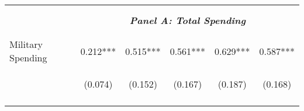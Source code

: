 \begin{tabular}{lccccc}
    \vspace{-2pt} & \vspace{-2pt} & \vspace{-2pt} & \vspace{-2pt} & \vspace{-2pt} \\\hline
    \vspace{-1.5pt} & \vspace{-1.5pt} & \vspace{-1.5pt} & \vspace{-1.5pt} & \vspace{-1.5pt} \\
    \cmidrule{2-6}
    \vspace{-1.5pt} & \vspace{-1.5pt} & \vspace{-1.5pt} & \vspace{-1.5pt} & \vspace{-1.5pt} \\
    & \multicolumn{5}{c}{\textit{\textbf{Panel A: Total Spending}}} \\ 
    \vspace{-1.5pt} & \vspace{-1.5pt} & \vspace{-1.5pt} & \vspace{-1.5pt} & \vspace{-1.5pt} \\ 
    \cmidrule{2-6}
    \vspace{-1.5pt} & \vspace{-1.5pt} & \vspace{-1.5pt} & \vspace{-1.5pt} & \vspace{-1.5pt}\\
    Military Spending & 0.212*** & 0.515*** & 0.561*** & 0.629*** & 0.587*** \\
    & \begin{footnotesize}(0.074)\end{footnotesize} & \begin{footnotesize}(0.152)\end{footnotesize} & \begin{footnotesize}(0.167)\end{footnotesize} & \begin{footnotesize}(0.187)\end{footnotesize} & \begin{footnotesize}(0.168)\end{footnotesize} \\
    \vspace{-1.5pt} & \vspace{-1.5pt} & \vspace{-1.5pt} & \vspace{-1.5pt} & \vspace{-1.5pt} \\
    

\end{tabular}
